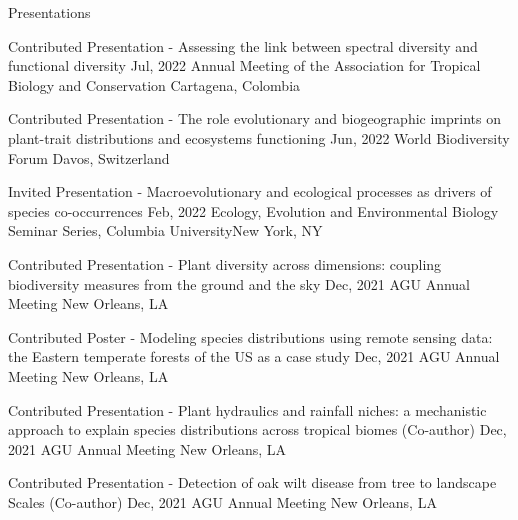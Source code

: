\documentclass{resume} %
\begin{document}

\begin{rSection}{Presentations}

\begin{sSubsection}{Contributed Presentation - Assessing the link between spectral diversity and functional diversity}{ \hfill }{Jul, 2022}{ Annual Meeting of the Association for Tropical Biology and Conservation }{Cartagena, Colombia}
\end{sSubsection}

\begin{sSubsection}{Contributed Presentation - The role evolutionary and biogeographic imprints on plant-trait distributions and ecosystems functioning}{ \hfill }{Jun, 2022}{ World Biodiversity Forum }{Davos, Switzerland}
\end{sSubsection}

\begin{sSubsection}{Invited Presentation - Macroevolutionary and ecological processes as drivers of species co-occurrences}{ \hfill }{Feb, 2022}{ Ecology, Evolution and Environmental Biology Seminar Series, Columbia University}{New York, NY}
\end{sSubsection}

\begin{sSubsection}{Contributed Presentation - Plant diversity across dimensions: coupling biodiversity measures from the ground and the sky}{ \hfill }{Dec, 2021}{ AGU Annual Meeting }{New Orleans, LA}
\end{sSubsection}

\begin{sSubsection}{Contributed Poster - Modeling species distributions using remote sensing data: the Eastern temperate forests of the US as a case study}{ }{Dec, 2021}{ AGU Annual Meeting }{New Orleans, LA}
\end{sSubsection}

\begin{sSubsection}{Contributed Presentation - Plant hydraulics and rainfall niches: a mechanistic approach to explain species distributions across tropical biomes}{ (Co-author) }{Dec, 2021}{ AGU Annual Meeting }{New Orleans, LA}
\end{sSubsection}

\begin{sSubsection}{Contributed Presentation - Detection of oak wilt disease from tree to landscape Scales}{ (Co-author) }{Dec, 2021}{ AGU Annual Meeting }{New Orleans, LA}
\end{sSubsection}


\end{rSection}
\end{document}
